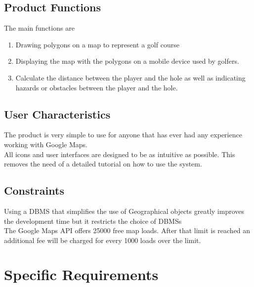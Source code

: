 \documentclass{article}
\begin{document}
    \subsection{Product Functions}
    The main functions are
    \begin{enumerate}
        \item
            Drawing polygons on a map to represent a golf course
        \item
            Displaying the map with the polygons on a mobile device used by
            golfers.
        \item
            Calculate the distance between the player and the hole as well as
            indicating hazards or  obstacles between the player and the hole.
    \end{enumerate}

    \subsection{User Characteristics}
    The product is very simple to use for anyone that has ever had any
    experience working with Google Maps.\\ All icons and user interfaces are
    designed to be as intuitive as possible. This removes the need of a detailed
    tutorial on how to use the system.

    \subsection{Constraints}
    Using a DBMS that simplifies the use of Geographical objects greatly
    improves the development time but it restricts the choice of DBMSs\\ The
    Google Maps API offers 25000 free map loads. After that limit is reached an
    additional fee will be charged for every 1000 loads over the limit.

    \newpage

    \section{Specific Requirements}
\end{document}
